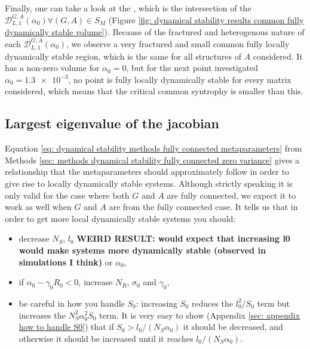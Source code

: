 \documentclass[12pt, titlepage]{report}
\begin{document}
Finally, one can take a look at the , which is the intersection of the $\mathcal{D}_{L,1}^{G,A}(\alpha_0) \forall (G,A) \in S_M$ (Figure \ref{fig: dynamical stability results common fully dynamically stable volume}). Because of the fractured and heterogenous nature of each $\mathcal{D}_{L,1}^{G,A}(\alpha_0)$, we observe a very fractured and small common fully locally dynamically stable region, which is the same for all structures of $A$ considered. It has a non-zero volume for $\alpha_0=0$, but for the next point investigated $\alpha_0=\num{1.3e-3}$, no point is fully locally dynamically stable for every matrix considered, which means that the critical common syntrophy is smaller than this.


\subsection{Largest eigenvalue of the jacobian} \label{sec: largest eigenvalue of the jacobian}
Equation \eqref{eq: dynamical stability methods fully connected metaparameters} from Methods \ref{sec: methods dynamical stability fully connected zero variance} gives a relationship that the metaparameters should approximately follow in order to give rise to locally dynamically stable systems. Although strictly speaking it is only valid for the case where both $G$ and $A$ are fully connected, we expect it to work as well when $G$ and $A$ are  from the fully connected case. It tells us that in order to get more local dynamically stable systems you should:
\begin{itemize}
  \item decrease $N_S$, $l_0$ \textbf{WEIRD RESULT: would expect that increasing l0 would make systems more dynamically stable (observed in simulations I think)} or $\alpha_0$,
  \item if $\alpha_0 - \gamma_0 R_0 < 0$, increase $N _R$, $\sigma_0$ and $\gamma_0$,
  \item be careful in how you handle $S_0$: increasing $S_0$ reduces the $l_0^2/S_0$ term but increases the $N_S^2 \alpha_0^2 S_0$ term. It is very easy to show (Appendix \ref{sec: appendix how to handle S0}) that if $S_0 > l_0/(N_S \alpha_0)$ it should be decreased, and otherwise it should be increased until it reaches $l_0/(N_S \alpha_0)$.
\end{itemize}
\end{document}
